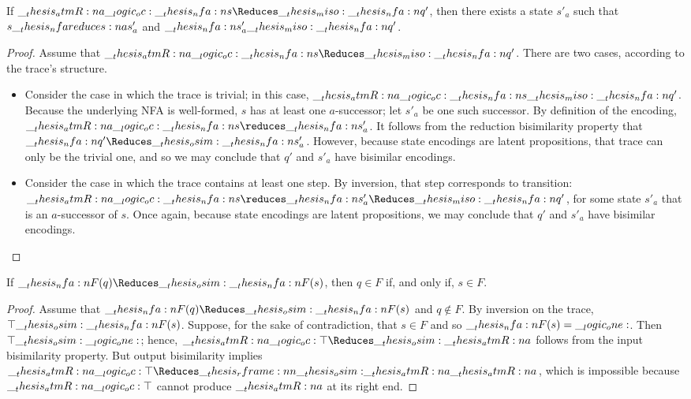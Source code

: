 \begin{lemma}
  If\/ $\atmR{a} \oc \nfa{s} \Reduces\miso \nfa{q}'$, then there exists a state $s'_a$ such that $s \nfareduces[a] s'_a$ and $\__thesis_nfa:n {s}'_a \__thesis_miso: \__thesis_nfa:n {q}'$.
\end{lemma}
%
\begin{proof}
  Assume that $\atmR{a} \oc \nfa{s} \Reduces\miso \nfa{q}'$.
  There are two cases, according to the trace's structure.
  \begin{itemize}
  \item Consider the case in which the trace is trivial; in this case, $\__thesis_atmR:n {a} \__logic_oc: \__thesis_nfa:n {s} \__thesis_miso: \__thesis_nfa:n {q}'$.
    Because the underlying \ac{NFA} is well-formed, $s$ has at least one $a$-successor;
    let $s'_a$ be one such successor.
    By definition of the encoding, $\atmR{a} \oc \nfa{s} \reduces \nfa{s}'_a$.
    It follows from the reduction bisimilarity property that $\nfa{q}' \Reduces\osim \nfa{s}'_a$.
    However, because state encodings are latent\autocite{??} propositions, that trace can only be the trivial one, and so we may conclude that $q'$ and $s'_a$ have bisimilar encodings.

  \item Consider the case in which the trace contains at least one step.
    By inversion, that step corresponds to  transition: $\atmR{a} \oc \nfa{s} \reduces \nfa{s}'_a \Reduces\miso \nfa{q}'$, for some state $s'_a$ that is an $a$-successor of $s$.
    Once again, because state encodings are latent propositions, we may conclude that $q'$ and $s'_a$ have bisimilar encodings.
  \qedhere
  \end{itemize}
\end{proof}


\begin{lemma}
  If $\nfa{F}(q) \Reduces\osim \nfa{F}(s)$, then $q \in F$ if, and only if, $s \in F$.
\end{lemma}
%
\begin{proof}
  Assume that $\nfa{F}(q) \Reduces\osim \nfa{F}(s)$ and $q \notin F$.
  By inversion on the trace, $\top \__thesis_osim: \__thesis_nfa:n {F}(s)$.
  Suppose, for the sake of contradiction, that $s \in F$ and so $\__thesis_nfa:n {F}(s) = \__logic_one:$.
  Then $\top \__thesis_osim: \__logic_one:$; hence, $\atmR{a} \oc \top \Reduces\osim \atmR{a}$ follows from the input bisimilarity property.
  But output bisimilarity implies $\atmR{a} \oc \top \Reduces\rframe{\osim}{\atmR{a}} \atmR{a}$, which is impossible because $\__thesis_atmR:n {a} \__logic_oc: \top$ cannot produce $\__thesis_atmR:n {a}$ at its right end.
\end{proof}

